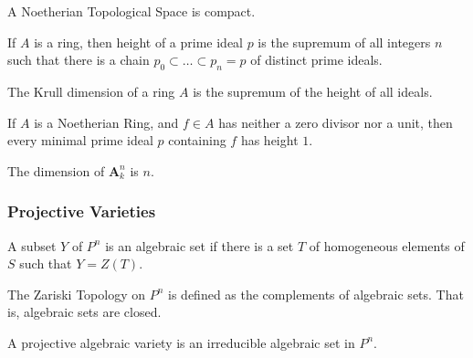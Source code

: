                \begin{theorem}
                    A Noetherian Topological Space is compact.
                \end{theorem}
                \begin{definition}
                    If $A$ is a ring, then height of a prime
                    ideal $p$ is the supremum of all integers $n$
                    such that there is a chain
                    $p_{0}\subset\hdots\subset{p_{n}}=p$
                    of distinct prime ideals.
                \end{definition}
                \begin{definition}
                    The Krull dimension of a ring $A$ is the
                    supremum of the height of all ideals.
                \end{definition}
                \begin{theorem}
                    If $A$ is a Noetherian Ring, and $f\in A$
                    has neither a zero divisor nor a unit,
                    then every minimal prime ideal $p$
                    containing $f$ has height $1$.
                \end{theorem}
                \begin{theorem}
                    The dimension of $\textbf{A}_{k}^{n}$ is $n$.
                \end{theorem}
            \subsubsection{Projective Varieties}
                \begin{definition}
                    A subset $Y$ of $P^n$ is an algebraic
                    set if there is a set $T$ of homogeneous
                    elements of $S$ such that $Y=Z(T)$.
                \end{definition}
                \begin{definition}
                    The Zariski Topology on $P^n$ is defined
                    as the complements of algebraic sets.
                    That is, algebraic sets are closed.
                \end{definition}
                \begin{definition}
                    A projective algebraic variety is an
                    irreducible algebraic set in $P^{n}$.
                \end{definition}
